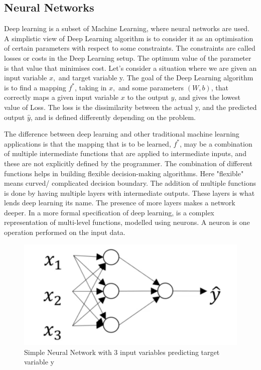 \subsection{Neural Networks}
Deep learning is a subset of Machine Learning, where neural networks are used. 
A simplistic view of Deep Learning algorithm is to consider it as an optimisation of certain parameters with respect to some constraints. The constraints are called losses or costs in the Deep Learning setup. The optimum value of the parameter is that value that minimises cost. Let's consider a situation where we are given an input variable \(x, \) and target variable y. The goal of the Deep Learning algorithm is to find a mapping \(f^*\), taking in \(x, \) and some parameters \((W, b)\), that correctly maps a given input variable \(x \) to the output \(y \), and gives the lowest value of Loss. The loss is the dissimilarity between the actual y, and the predicted output \(\hat{y}\), and is defined differently depending on the problem.

The difference between deep learning and other traditional machine learning applications is that the mapping that is to be learned, \( f^* \), may be a combination of multiple intermediate functions that are applied to intermediate inputs, and these are not explicitly defined by the programmer. The combination of different functions helps in building flexible decision-making algorithms. Here "flexible" means curved/ complicated decision boundary. The addition of multiple functions is done by having multiple layers with intermediate outputs. These layers is what lends deep learning its name. The presence of more layers makes a network deeper.
In a more formal specification of deep learning, is a complex representation of multi-level functions, modelled using neurons. A neuron is one operation performed on the input data. 


\begin{figure}
    \centering
    \includegraphics[height=0.15\paperheight]{Figures/nn_simple.png}
    \caption{Simple Neural Network with 3 input variables predicting target variable y
    \cite{noauthor_neural_nodate}}
    \label{fig:NN_diagram}
\end{figure}

